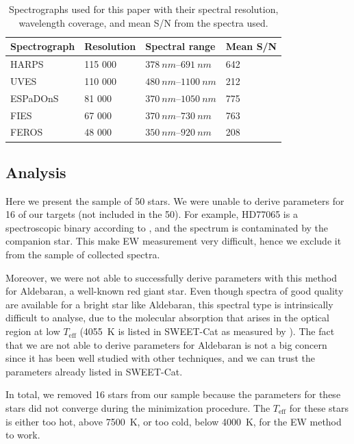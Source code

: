 \documentclass{aa}
\begin{document}
\begin{table}[htb!]
    \caption{Spectrographs used for this paper with their spectral resolution,
             wavelength coverage, and mean S/N from the spectra used.}
    \label{tab:instruments}
    \centering
    \begin{tabular}{llll}
      \hline\hline
      Spectrograph & Resolution & Spectral range              &   Mean S/N  \\
      \hline
      HARPS        &    115 000 & $\SIrange{378}{691}{nm}$    &   642       \\
      UVES         &    110 000 & $\SIrange{480}{1100}{nm}$   &   212       \\
      ESPaDOnS     &     81 000 & $\SIrange{370}{1050}{nm}$   &   775       \\
      FIES         &     67 000 & $\SIrange{370}{730}{nm}$    &   763       \\
      FEROS        &     48 000 & $\SIrange{350}{920}{nm}$    &   208       \\
      \hline
    \end{tabular}
\end{table}



\subsection{Analysis}
\label{sec:results}
Here we present the sample of 50 stars. We were unable to derive parameters for
{16 of our targets (not included in the 50)}. For example, HD77065 is a
spectroscopic binary according to \cite{Pourbaix2004}, and the spectrum is
contaminated by the companion star. This make EW measurement very difficult,
hence we exclude it from the sample of collected spectra.

Moreover, we were not able to successfully derive parameters with this method
for Aldebaran, a well-known red giant star. Even though spectra of good quality
are available for a bright star like Aldebaran, this spectral type is
intrinsically difficult to analyse, due to the molecular absorption that arises
in the optical region at low $T_\mathrm{eff}$ (\SI{4055}{K} is listed in
SWEET-Cat as measured by \citealt{Hatzes2015}). The fact that we are not able to
derive parameters for Aldebaran is not a big concern since it has been well
studied with other techniques, and we can trust the parameters already listed in
SWEET-Cat.

In total, we removed 16 stars from our sample because the parameters for these
stars did not converge during the minimization procedure. The $T_\mathrm{eff}$
for these stars is either too hot, above \SI{7500}{K}, or too cold, below
\SI{4000}{K}, for the EW method to work.
\end{document}
